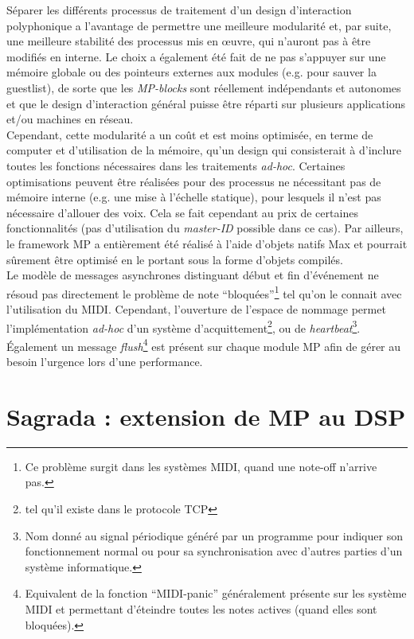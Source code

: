 \noindent Séparer les différents processus de traitement d'un design d'interaction polyphonique a l'avantage de permettre une meilleure modularité et, par suite, une meilleure stabilité des processus mis en œuvre, qui n'auront pas à être modifiés en interne. Le choix a également été fait de ne pas s'appuyer sur une mémoire globale ou des pointeurs externes aux modules (e.g. pour sauver la guestlist), de sorte que les \textit{MP-blocks} sont réellement indépendants et autonomes et que le design d'interaction général puisse être réparti sur plusieurs applications et/ou machines en réseau.\\
\indent Cependant, cette modularité a un coût et est moins optimisée, en terme de computer et d'utilisation de la mémoire, qu'un design qui consisterait à d'inclure toutes les fonctions nécessaires dans les traitements \textit{ad-hoc}. Certaines optimisations peuvent être réalisées pour des processus ne nécessitant pas de mémoire interne (e.g. une mise à l'échelle statique), pour lesquels il n'est pas nécessaire d'allouer des voix. Cela se fait cependant au prix de certaines fonctionnalités (pas d'utilisation du \textit{master-ID} possible dans ce cas). Par ailleurs, le framework MP a entièrement été réalisé à l'aide d'objets natifs Max et pourrait sûrement être optimisé en le portant sous la forme d'objets compilés.\\
\indent Le modèle de messages asynchrones distinguant début et fin d'événement ne résoud pas directement le problème de note ``bloquées''\footnote{Ce problème surgit dans les systèmes MIDI, quand une note-off n'arrive pas.} tel qu'on le connait avec l'utilisation du \gls{MIDI}. Cependant, l'ouverture de l'espace de nommage permet l'implémentation \textit{ad-hoc} d'un système d'acquittement\footnote{tel qu'il existe dans le protocole \gls{TCP}}, ou de \textit{heartbeat}\footnote{Nom donné au signal périodique généré par un programme pour indiquer son fonctionnement normal ou pour sa synchronisation avec d'autres parties d'un système informatique.}. Également un message \textit{flush}\footnote{Equivalent de la fonction ``MIDI-panic'' généralement présente sur les système MIDI et permettant d'éteindre toutes les notes actives (quand elles sont bloquées).} est présent sur chaque module MP afin de gérer au besoin l'urgence lors d'une performance.


\section{Sagrada : extension de MP au DSP}
\label{sec:algorithms:sagrada}

